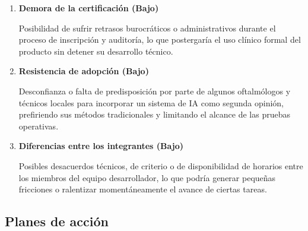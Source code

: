 \begin{enumerate}[label=\textbf{R\arabic* - }]
                \item \textbf{Demora de la certificación (Bajo)}
                
                  Posibilidad de sufrir retrasos burocráticos o administrativos durante el proceso de inscripción y auditoría, lo que postergaría el uso clínico formal del producto sin detener su desarrollo técnico.
    
                \item \textbf{Resistencia de adopción (Bajo) }
                
                  Desconfianza o falta de predisposición por parte de algunos oftalmólogos y técnicos locales para incorporar un sistema de IA como segunda opinión, prefiriendo sus métodos tradicionales y limitando el alcance de las pruebas operativas.
    
                \item \textbf{Diferencias entre los integrantes (Bajo)} 
                
                  Posibles desacuerdos técnicos, de criterio o de disponibilidad de horarios entre los miembros del equipo desarrollador, lo que podría generar pequeñas fricciones o ralentizar momentáneamente el avance de ciertas tareas.
                
            \end{enumerate}

        \subsection{Planes de acción}
    
